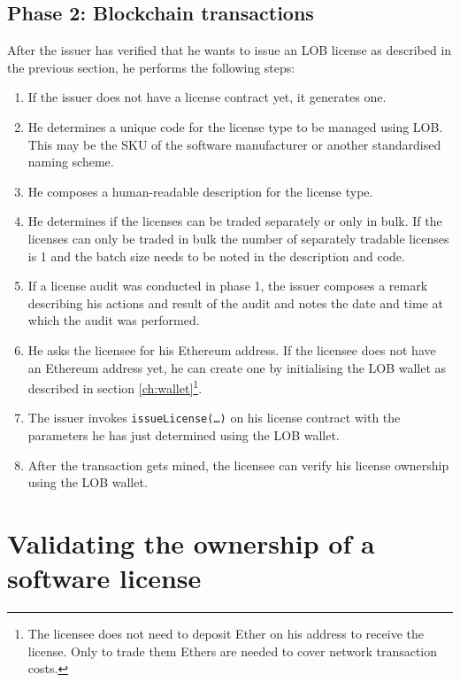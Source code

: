 \documentclass[a4paper]{article}
\begin{document}
\subsection{Phase 2: Blockchain transactions}

After the issuer has verified that he wants to issue an LOB license as described in the previous section, he performs the following steps:

\begin{enumerate}
  \item If the issuer does not have a license contract yet, it generates one.
  \item He determines a unique code for the license type to be managed using LOB. This may be the SKU of the software manufacturer or another standardised naming scheme.
  \item He composes a human-readable description for the license type.
  \item He determines if the licenses can be traded separately or only in bulk. If the licenses can only be traded in bulk the number of separately tradable licenses is 1 and the batch size needs to be noted in the description and code.
  \item If a license audit was conducted in phase 1, the issuer composes a remark describing his actions and result of the audit and notes the date and time at which the audit was performed.
  \item He asks the licensee for his Ethereum address. If the licensee does not have an Ethereum address yet, he can create one by initialising the LOB wallet as described in section \ref{ch:wallet}\footnote{The licensee does not need to deposit Ether on his address to receive the license. Only to trade them Ethers are needed to cover network transaction costs.}.
  \item The issuer invokes \texttt{issueLicense(…)} on his license contract with the parameters he has just determined using the LOB wallet.
  \item After the transaction gets mined, the licensee can verify his license ownership using the LOB wallet.
\end{enumerate}





\section{Validating the ownership of a software license}
\label{ch:validatingOwnership}
\end{document}
